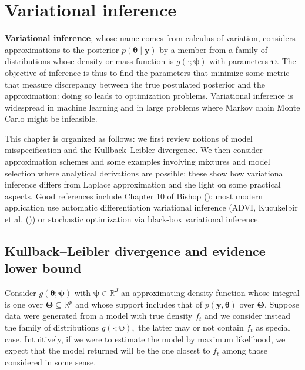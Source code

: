 \documentclass[
  11pt,
  letterpaper,
]{scrbook}
\theoremstyle{definition}
\theoremstyle{plain}
\theoremstyle{plain}
\theoremstyle{plain}
\theoremstyle{definition}
\theoremstyle{definition}
\theoremstyle{plain}
\theoremstyle{plain}
\theoremstyle{remark}
\begin{document}

\chapter{Variational inference}\label{variational-inference}

\textbf{Variational inference}, whose name comes from calculus of
variation, considers approximations to the posterior
\(p(\boldsymbol{\theta} \mid \boldsymbol{y})\) by a member from a family
of distributions whose density or mass function is
\(g(\cdot; \boldsymbol{\psi})\) with parameters \(\boldsymbol{\psi}.\)
The objective of inference is thus to find the parameters that minimize
some metric that measure discrepancy between the true postulated
posterior and the approximation: doing so leads to optimization
problems. Variational inference is widespread in machine learning and in
large problems where Markov chain Monte Carlo might be infeasible.

This chapter is organized as follows: we first review notions of model
misspecification and the Kullback--Leibler divergence. We then consider
approximation schemes and some examples involving mixtures and model
selection where analytical derivations are possible: these show how
variational inference differs from Laplace approximation and she light
on some practical aspects. Good references include Chapter 10 of Bishop
(); most modern application use
automatic differentiation variational inference (ADVI, Kucukelbir et al.
()) or stochastic optimization via
black-box variational inference.

\section{Kullback--Leibler divergence and evidence lower
bound}\label{kullbackleibler-divergence-and-evidence-lower-bound}

Consider \(g(\boldsymbol{\theta};\boldsymbol{\psi})\) with
\(\boldsymbol{\psi} \in \mathbb{R}^J\) an approximating density function
whose integral is one over
\(\boldsymbol{\Theta} \subseteq \mathbb{R}^p\) and whose support
includes that of \(p(\boldsymbol{y}, \boldsymbol{\theta})\) over
\(\boldsymbol{\Theta}.\) Suppose data were generated from a model with
true density \(f_t\) and we consider instead the family of distributions
\(g(\cdot; \boldsymbol{\psi}),\) the latter may or not contain \(f_t\)
as special case. Intuitively, if we were to estimate the model by
maximum likelihood, we expect that the model returned will be the one
closest to \(f_t\) among those considered in some sense.
\end{document}

